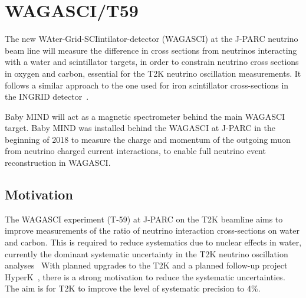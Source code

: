 
\newpage
\clearpage

\section{WAGASCI/T59}\label{sec:WAGASCI}

The new WAter-Grid-SCIintilator-detector (WAGASCI) at the J-PARC neutrino beam line will measure the difference in cross sections from neutrinos interacting with a water and scintillator targets, in order to constrain neutrino cross sections in oxygen and carbon, essential for the T2K neutrino oscillation measurements. It follows a similar approach to the one used for iron scintillator cross-sections in the INGRID detector~\cite{21T2K}.

Baby MIND will act as a magnetic spectrometer behind the main WAGASCI target. Baby MIND was installed behind the WAGASCI at J-PARC in the beginning of 2018 to measure the charge and momentum of the outgoing muon from neutrino charged current interactions, to enable full neutrino event reconstruction in WAGASCI.

\subsection{Motivation}
The WAGASCI experiment (T-59) at J-PARC on the T2K beamline aims to improve measurements of the ratio of neutrino interaction cross-sections on water and carbon. This is required to reduce systematics due to nuclear effects in water, currently the dominant systematic uncertainty in the T2K neutrino oscillation analyses~\cite{21T2K} With planned upgrades to the T2K and a planned follow-up project HyperK~\cite{24HyperK}, there is a strong motivation to reduce the systematic uncertainties. The aim is for T2K to improve the level of systematic precision to 4\%. 


